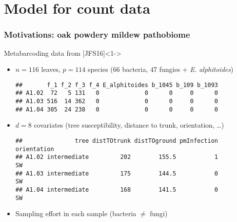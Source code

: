 \section{Model for count data}



\begin{frame}[fragile]
  \frametitle{Motivations: oak powdery mildew pathobiome}

  \begin{block}{Metabarcoding data from [JFS16]}<1->
    \begin{itemize}
    \item $n = 116$ leaves, $p = 114$ species ($66$ bacteria, $47$ fungies + \textit{E. alphitoides})
\begin{knitrout}
\color{fgcolor}\begin{kframe}
\begin{alltt}
\hlstd{counts[}\hlopt{:}\hlstd{,} \hlstd{(}\hlopt{:}\hlstd{,} \hlopt{:}\hlstd{)]}
\end{alltt}
\begin{verbatim}
##       f_1 f_2 f_3 f_4 E_alphitoides b_1045 b_109 b_1093
## A1.02  72   5 131   0             0      0     0      0
## A1.03 516  14 362   0             0      0     0      0
## A1.04 305  24 238   0             0      0     0      0
\end{verbatim}
\end{kframe}
\end{knitrout}
    \item $d = 8$ covariates (tree susceptibility, distance to trunk, orientation, \dots)
\begin{knitrout}
\color{fgcolor}\begin{kframe}
\begin{alltt}
\hlstd{covariates[}\hlopt{:}\hlstd{, ]}
\end{alltt}
\begin{verbatim}
##               tree distTOtrunk distTOground pmInfection orientation
## A1.02 intermediate         202        155.5           1          SW
## A1.03 intermediate         175        144.5           0          SW
## A1.04 intermediate         168        141.5           0          SW
\end{verbatim}
\end{kframe}
\end{knitrout}
    \item Sampling effort in each sample (bacteria $\neq$  fungi)

\end{itemize}
\end{block}
\end{frame}
